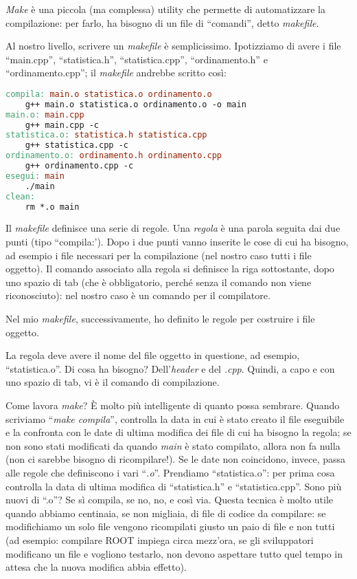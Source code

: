 \emph{Make} è una piccola (ma complessa) utility che permette di automatizzare la compilazione: per farlo, ha bisogno di un file di ``comandi'', detto \emph{makefile}. 

Al nostro livello, scrivere un \emph{makefile} è semplicissimo. Ipotizziamo di avere i file ``main.cpp'', ``statistica.h'', ``statistica.cpp'', ``ordinamento.h'' e ``ordinamento.cpp''; il \emph{makefile} andrebbe scritto così:
\begin{lstlisting}[language=make,  caption=makefile]
compila: main.o statistica.o ordinamento.o
	g++ main.o statistica.o ordinamento.o -o main
main.o: main.cpp
	g++ main.cpp -c
statistica.o: statistica.h statistica.cpp
	g++ statistica.cpp -c
ordinamento.o: ordinamento.h ordinamento.cpp
	g++ ordinamento.cpp -c
esegui: main
	./main
clean:
	rm *.o main
\end{lstlisting}

Il \emph{makefile} definisce una serie di regole. Una \emph{regola} è una parola seguita dai due punti (tipo ``compila:'). Dopo i due punti vanno inserite le cose di cui ha bisogno, ad esempio i file necessari per la compilazione (nel nostro caso tutti i file oggetto). Il comando associato alla regola si definisce la riga sottostante, dopo uno spazio di tab (che è obbligatorio, perché senza il comando non viene riconosciuto): nel nostro caso è un comando per il compilatore.

Nel mio \emph{makefile}, successivamente, ho definito le regole per costruire i file oggetto. 

La regola deve avere il nome del file oggetto in questione, ad esempio, ``statistica.o''. Di cosa ha bisogno? Dell'\emph{header} e del \emph{.cpp}. Quindi, a capo e con uno spazio di tab, vi è il comando di compilazione. 

Come lavora  \emph{make}? È molto più intelligente di quanto possa sembrare. Quando scriviamo ``\emph{make compila}'', controlla la data in cui è stato creato il file eseguibile e la confronta con le date di ultima modifica dei file di cui ha bisogno la regola; se non sono stati modificati da quando \emph{main} è stato compilato, allora non fa nulla (non ci sarebbe bisogno di ricompilare!). Se le date non coincidono, invece, passa alle regole che definiscono i vari ``\emph{.o}''. Prendiamo ``statistica.o'': per prima cosa controlla la data di ultima modifica di ``statistica.h'' e ``statistica.cpp''. Sono più nuovi di ``.o''? Se sì compila, se no, no, e così via. Questa tecnica è molto utile quando abbiamo centinaia, se non migliaia, di file di codice da compilare: se modifichiamo un solo file vengono ricompilati giusto un paio di file e non tutti (ad esempio: compilare ROOT impiega circa mezz'ora, se gli sviluppatori modificano un file e vogliono testarlo, non devono aspettare tutto quel tempo in attesa che la nuova modifica abbia effetto).

